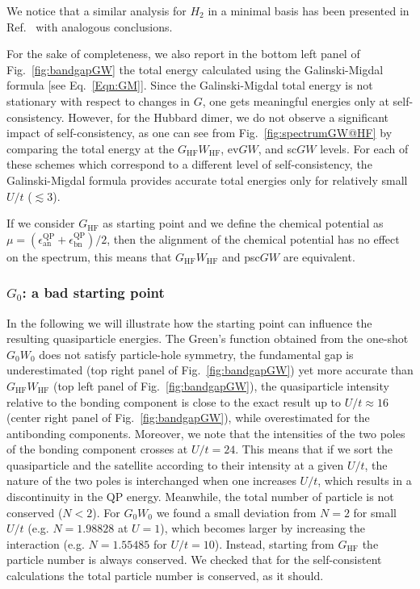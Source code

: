 \documentclass[aps,prb,reprint,superscriptaddress]{revtex4-1}
\newcommand{\Nel}{N}
\newcommand{\eps}{\epsilon}
\newcommand{\bn}{\text{bn}}
\newcommand{\an}{\text{an}}
\begin{document}
We notice that a similar analysis for $H_2$ in a minimal basis has been presented in Ref.~\citep{Hellgren_2015} with analogous conclusions.

For the sake of completeness, we also report in the bottom left panel of Fig.~\ref{fig:bandgapGW} the total energy calculated using the Galinski-Migdal formula [see Eq.~\eqref{Eqn:GM}]. Since the Galinski-Migdal total energy is not stationary with respect to changes in $G$, one gets meaningful energies only at self-consistency. However, for the Hubbard dimer, we do not observe a significant impact of self-consistency, as one can see from Fig.~\ref{fig:spectrumGW@HF} by comparing the total energy at the $G_{\text{HF}}W_{\text{HF}}$, ev$GW$, and sc$GW$ levels. For each of these schemes which correspond to a different level of self-consistency, the Galinski-Migdal formula provides accurate total energies only for relatively small $U/t$ ($\lesssim 3$).

If we consider $G_{\text{HF}}$ as starting point and we define the chemical potential as $\mu=(\eps_\an^\text{QP}+\eps_\bn^\text{QP})/2$, then the alignment of the chemical potential has no effect on the spectrum, this means that $G_{\text{HF}}W_{\text{HF}}$ and psc$GW$ are equivalent.


\subsubsection{$G_0$: a bad starting point\label{G0_SP}}
In the following we will illustrate how the starting point can influence the resulting quasiparticle energies.
The Green's function obtained from the one-shot $G_0W_0$ does not satisfy particle-hole symmetry, the fundamental gap is underestimated  (top right panel of Fig.~\ref{fig:bandgapGW}) yet more accurate than $G_\text{HF}W_\text{HF}$ (top left panel of Fig.~\ref{fig:bandgapGW}), the quasiparticle intensity relative to the bonding component is close to the exact result up to $U/t\approx16$ (center right panel of Fig.~\ref{fig:bandgapGW}), while overestimated for the antibonding components. 
Moreover, we note that the intensities of the two poles of the bonding component crosses at $U/t=24$.
This means that if we sort the quasiparticle and the satellite according to their intensity at a given $U/t$, the nature of the two poles is interchanged when one increases $U/t$, which results in a discontinuity in the QP energy.
Meanwhile, the total number of particle is not conserved ($\Nel<2$). For $G_0W_0$ we found a small deviation from $\Nel=2$ for small $U/t$ (e.g. $\Nel=1.98828$ at $U=1$), which becomes larger by increasing the interaction (e.g. $\Nel=1.55485$ for $U/t=10$). Instead, starting from $G_\text{HF}$ the particle number is always conserved. We checked that for the self-consistent calculations the total particle number is conserved, as it should.
\end{document}
